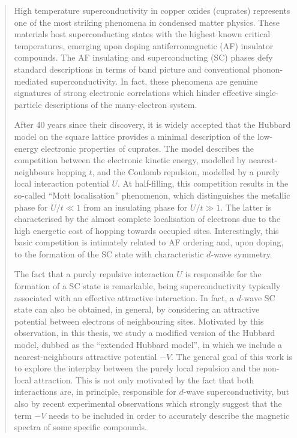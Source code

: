 \begin{abstract}
	High temperature superconductivity in copper oxides (cuprates) represents one of the most striking phenomena in condensed matter physics. These materials host superconducting states with the highest known critical temperatures, emerging upon doping antiferromagnetic (AF) insulator compounds. The AF insulating and superconducting (SC) phases defy standard descriptions in terms of band picture and conventional phonon-mediated superconductivity. In fact, these phenomena are genuine signatures of strong electronic correlations which hinder effective single-particle descriptions of the many-electron system.
	
	After 40 years since their discovery, it is widely accepted that the Hubbard model on the square lattice provides a minimal description of the low-energy electronic properties of cuprates. The model describes the competition between the electronic kinetic energy, modelled by nearest-neighbours hopping $t$, and the Coulomb repulsion, modelled by a purely local interaction potential $U$. At half-filling, this competition results in the so-called ``Mott localisation'' phenomenon, which distinguishes the metallic phase for $U/t \ll 1$ from an insulating phase for $U/t \gg 1$. The latter is characterised by the almost complete localisation of electrons due to the high energetic cost of hopping towards occupied sites. Interestingly, this basic competition is intimately related to AF ordering and, upon doping, to the formation of the SC state with characteristic $d$-wave symmetry.
	
	The fact that a purely repulsive interaction $U$ is responsible for the formation of a SC state is remarkable, being superconductivity typically associated with an effective attractive interaction. In fact, a $d$-wave SC state can also be obtained, in general, by considering an attractive potential between electrons of neighbouring sites. Motivated by this observation, in this thesis, we study a modified version of the Hubbard model, dubbed as the ``extended Hubbard model'', in which we include a nearest-neighbours attractive potential $-V$. The general goal of this work is to explore the interplay between the purely local repulsion and the non-local attraction. This is not only motivated by the fact that both interactions are, in principle, responsible for $d$-wave superconductivity, but also by recent experimental observations which strongly suggest that the term $-V$ needs to be included in order to accurately describe the magnetic spectra of some specific compounds.
	

\end{abstract}
